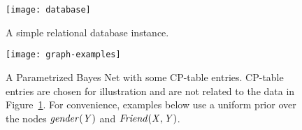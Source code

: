 \documentclass[twoside,leqno,twocolumn]{article}
\begin{document}



\begin{figure}[t]
\begin{center}
\texttt{[image: database]}
\caption{A simple relational database instance.
\label{fig:db-tables}}
\end{center}
\end{figure}


\begin{figure}[t]
\begin{center}
\texttt{[image: graph-examples]}
\caption{%
A Parametrized Bayes Net with some CP-table entries. CP-table entries are chosen for illustration and are not related to the data in Figure~\ref{fig:db-tables}. For convenience, examples below use a uniform prior over the nodes $\it{gender}(Y)$ and $\it{Friend}(X,Y)$.
\label{fig:pbn}}
\end{center}
\end{figure}

  
\end{document}
